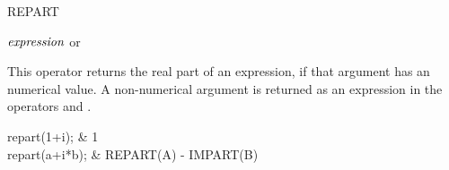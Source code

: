 \begin{Operator}[repart]{REPART}
\begin{Syntax}
\(\meta{expression}\) or  
\end{Syntax}

This operator returns the real part of an expression, if that argument has an
numerical value.  A non-numerical argument is returned as an expression in
the operators  and .
\begin{Examples}
repart(1+i);   & 1 \\
repart(a+i*b); & REPART(A) - IMPART(B)
\end{Examples}

\end{Operator}


